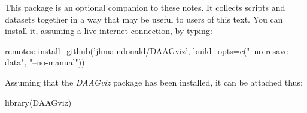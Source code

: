 This package is an optional companion to these notes. 
It collects scripts and datasets together in a way that may be
useful to users of this text.  
You can install it, assuming a live internet connection,
by typing:

\begin{fullwidth}

\begin{Schunk}
\begin{Sinput}
remotes::install_github('jhmaindonald/DAAGviz',
                        build_opts=c("--no-resave-data", 
                                     "--no-manual"))
\end{Sinput}
\end{Schunk}

\end{fullwidth}

Assuming that the {\em DAAGviz} package has been installed, it can be attached thus:
\begin{Schunk}
\begin{Sinput}
library(DAAGviz)
\end{Sinput}
\end{Schunk}

